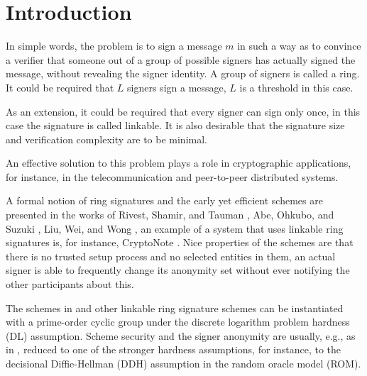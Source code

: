 \documentclass{mathcryptology} %
\theoremstyle{title}
\theoremstyle{titleof}
\begin{document}
\begin{NoHyper}
\articleinformation %
\end{NoHyper}


\section{Introduction}
    In simple words, the problem is to sign a message $m$ in such a way as to convince a verifier that someone out of a group of possible signers has actually signed the message, without revealing the signer identity. A group of signers is called a ring. It could be required that $L$ signers sign a message, $L$ is a threshold in this case.

    As an extension, it could be required that every signer can sign only once, in this case the signature is called linkable. It is also desirable that the signature size and verification complexity are to be minimal.

    An effective solution to this problem plays a role in cryptographic applications, for instance, in the telecommunication and peer-to-peer distributed systems.

    A formal notion of ring signatures and the early yet efficient schemes are presented in the works of Rivest, Shamir, and Tauman \cite{17}, Abe, Ohkubo, and Suzuki \cite{1}, Liu, Wei, and Wong \cite{13}, an example of a system that uses linkable ring signatures is, for instance, CryptoNote \cite{15}. Nice properties of the schemes are that there is no trusted setup process and no selected entities in them, an actual signer is able to frequently change its anonymity set without ever notifying the other participants about this.

    The schemes in \cite{1,13} and other linkable ring signature schemes can be instantiated with a prime-order cyclic group under the discrete logarithm problem hardness (DL) assumption. Scheme security and the signer anonymity are usually, e.g., as in \cite{13}, reduced to one of the stronger hardness assumptions, for instance, to the decisional Diffie-Hellman (DDH) assumption in the random oracle model (ROM).
\end{document}
